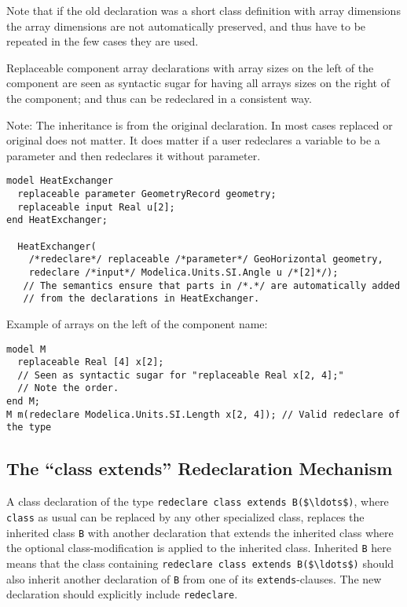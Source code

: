 Note that if the old declaration was a short class definition with array
dimensions the array dimensions are not automatically preserved, and
thus have to be repeated in the few cases they are used.

Replaceable component array declarations with array sizes on the left of
the component are seen as syntactic sugar for having all arrays sizes on
the right of the component; and thus can be redeclared in a consistent
way.

\begin{nonnormative}
Note: The inheritance is from the original declaration. In most
cases replaced or original does not matter. It does matter if a user
redeclares a variable to be a parameter and then redeclares it without
parameter.
\end{nonnormative}

\begin{nonnormative}
\begin{lstlisting}[language=modelica]
model HeatExchanger
  replaceable parameter GeometryRecord geometry;
  replaceable input Real u[2];
end HeatExchanger;

  HeatExchanger(
    /*redeclare*/ replaceable /*parameter*/ GeoHorizontal geometry,
    redeclare /*input*/ Modelica.Units.SI.Angle u /*[2]*/);
   // The semantics ensure that parts in /*.*/ are automatically added
   // from the declarations in HeatExchanger.
\end{lstlisting}

Example of arrays on the left of the component name:
\begin{lstlisting}[language=modelica]
model M
  replaceable Real [4] x[2];
  // Seen as syntactic sugar for "replaceable Real x[2, 4];"
  // Note the order.
end M;
M m(redeclare Modelica.Units.SI.Length x[2, 4]); // Valid redeclare of the type
\end{lstlisting}
\end{nonnormative}

\subsection{The ``class extends'' Redeclaration Mechanism}\label{the-class-extends-redeclaration-mechanism}

A class declaration of the type \lstinline!redeclare class extends B($\ldots$)!, where \lstinline!class! as usual can be replaced by any other specialized class, replaces the inherited class \lstinline!B! with another declaration that extends the inherited class where the optional class-modification is applied to the inherited class.
Inherited \lstinline!B! here means that the class containing \lstinline!redeclare class extends B($\ldots$)! should also inherit another declaration of \lstinline!B! from one of its \lstinline!extends!-clauses.
The new declaration should explicitly include \lstinline!redeclare!.

